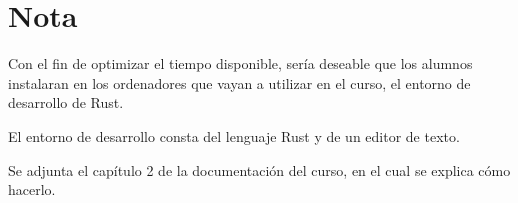 \chapter*{Nota}
\label{sec_prologo}

\noindent Con el fin de optimizar el tiempo disponible, sería deseable que los alumnos instalaran en los ordenadores que vayan a utilizar en el curso, el entorno de desarrollo de Rust.

\smallskip

El entorno de desarrollo consta del lenguaje Rust y de un editor de texto.

\smallskip

Se adjunta el capítulo 2 de la documentación del curso, en el cual se explica cómo hacerlo.


